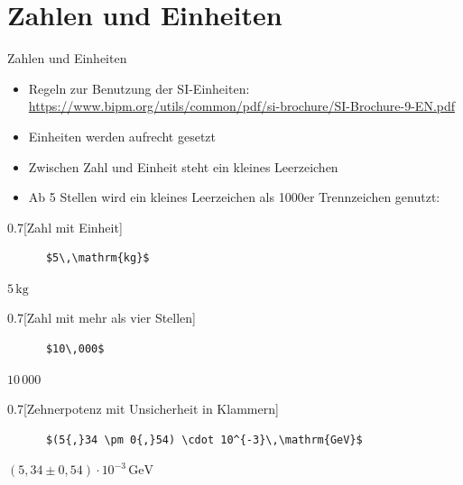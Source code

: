 \section{Zahlen und Einheiten}

\begin{frame}[fragile]{Zahlen und Einheiten}
  \begin{itemize}
    \item Regeln zur Benutzung der SI-Einheiten: \\
      \url{https://www.bipm.org/utils/common/pdf/si-brochure/SI-Brochure-9-EN.pdf}
    \item Einheiten werden aufrecht gesetzt
    \item Zwischen Zahl und Einheit steht ein kleines Leerzeichen
    \item Ab 5 Stellen wird ein kleines Leerzeichen als 1000er Trennzeichen genutzt:
  \end{itemize}

  \begin{CodeExample}{0.7}[Zahl mit Einheit]
    \begin{verbatim}
      $5\,\mathrm{kg}$
    \end{verbatim}
    \CodeResult
    $5\,\mathrm{kg}$
  \end{CodeExample}
  \begin{CodeExample}{0.7}[Zahl mit mehr als vier Stellen]
    \begin{verbatim}
      $10\,000$
    \end{verbatim}
    \CodeResult
    $10\,000$
  \end{CodeExample}
  \begin{CodeExample}{0.7}[Zehnerpotenz mit Unsicherheit in Klammern]
    \begin{verbatim}
      $(5{,}34 \pm 0{,}54) \cdot 10^{-3}\,\mathrm{GeV}$
    \end{verbatim}
    \CodeResult
    $(5{,}34 \pm 0{,}54) \cdot 10^{-3}\,\mathrm{GeV}$
  \end{CodeExample}

\end{frame}

